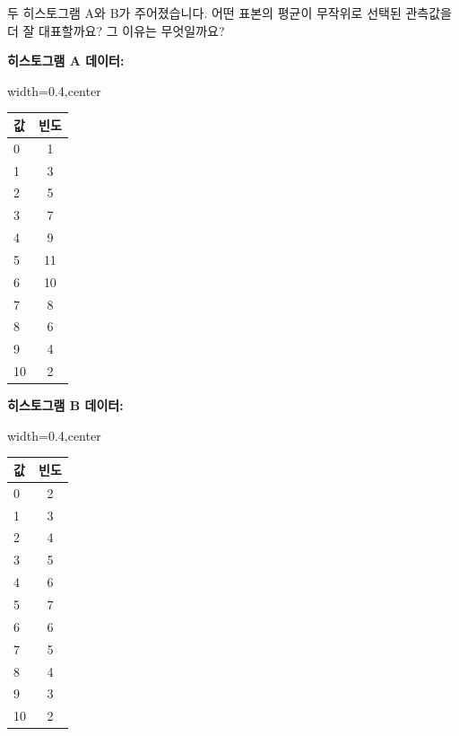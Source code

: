 \documentclass[11pt,a4paper]{article}
\theoremstyle{definition}
\begin{document}
\begin{examplebox}[title=연습 문제: 히스토그램을 통한 평균의 대표성 판단]
두 히스토그램 A와 B가 주어졌습니다. 어떤 표본의 평균이 무작위로 선택된 관측값을 더 잘 대표할까요? 그 이유는 무엇일까요?

\textbf{히스토그램 A 데이터:}
\begin{adjustbox}{width=0.4\textwidth,center}
\begin{tabular}{lc}
\toprule
\textbf{값} & \textbf{빈도} \\
\midrule
0 & 1 \\
1 & 3 \\
2 & 5 \\
3 & 7 \\
4 & 9 \\
5 & 11 \\
6 & 10 \\
7 & 8 \\
8 & 6 \\
9 & 4 \\
10 & 2 \\
\bottomrule
\end{tabular}
\end{adjustbox}
\label{tab:histogram_a}

\textbf{히스토그램 B 데이터:}
\begin{adjustbox}{width=0.4\textwidth,center}
\begin{tabular}{lc}
\toprule
\textbf{값} & \textbf{빈도} \\
\midrule
0 & 2 \\
1 & 3 \\
2 & 4 \\
3 & 5 \\
4 & 6 \\
5 & 7 \\
6 & 6 \\
7 & 5 \\
8 & 4 \\
9 & 3 \\
10 & 2 \\
\bottomrule
\end{tabular}
\end{adjustbox}
\label{tab:histogram_b}


\end{examplebox}
\end{document}
